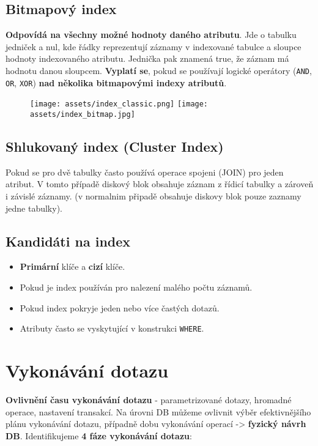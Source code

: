 \subsection{Bitmapový index}
\textbf{Odpovídá na všechny možné hodnoty daného atributu}. Jde o tabulku jedniček a nul, kde řádky reprezentují záznamy v indexované tabulce a sloupce hodnoty indexovaného atributu. Jednička pak znamená true, že záznam má hodnotu danou sloupcem. \textbf{Vyplatí se}, pokud se používají logické operátory (\texttt{AND}, \texttt{OR}, \texttt{XOR}) \textbf{nad několika bitmapovými indexy atributů}.

\begin{figure}[H]
  \centering
  \texttt{[image: assets/index\_classic.png]}
  \texttt{[image: assets/index\_bitmap.jpg]}
\end{figure}

\subsection{Shlukovaný index (Cluster Index)}
Pokud se pro dvě tabulky často používá operace spojeni (JOIN) pro jeden atribut. V tomto případě diskový blok obsahuje záznam z řídicí tabulky a zároveň i závislé záznamy. (v normalnim připadě obsahuje diskovy blok pouze zaznamy jedne tabulky).

\subsection{Kandidáti na index}
\begin{itemize}
  \item \textbf{Primární} klíče a \textbf{cizí} klíče.
  \item Pokud je index používán pro nalezení malého počtu záznamů.
  \item Pokud index pokryje jeden nebo více častých dotazů.
  \item Atributy často se vyskytující v konstrukci \texttt{WHERE}.
\end{itemize}

\section{Vykonávání dotazu}
\textbf{Ovlivnění času vykonávání dotazu} - parametrizované dotazy, hromadné operace, nastavení transakcí. Na úrovni DB můžeme ovlivnit výběr efektivnějšího plánu vykonávání dotazu, případně dobu vykonávání operací -> \textbf{fyzický návrh DB}. Identifikujeme \textbf{4 fáze vykonávání dotazu}:

